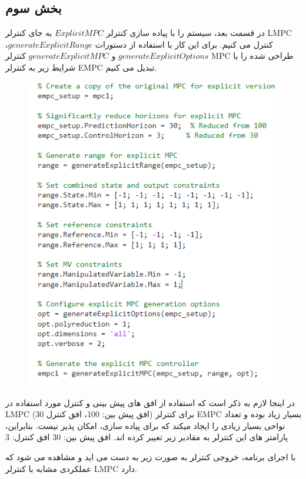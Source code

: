 \subsection*{بخش سوم}
در قسمت بعد، سیستم را با پیاده سازی کنترلر $Explicit MPC$ به جای کنترلر LMPC کنترل می کنیم. 
برای این کار با استفاده از دستورات $generateExplicitRange$،
$generateExplicitOptions$ و 
$generateExplicitMPC$
کنترلر MPC طراحی شده را با شرایط زیر به کنترلر EMPC تبدیل می کنیم. 
\begin{figure}[H]
	\centering
	\includegraphics[width=1\linewidth]{../img/26}
	\caption{}
	\label{fig:26}
\end{figure}

در اینجا لازم به ذکر است که استفاده از افق های پیش بینی و کنترل مورد استفاده در LMPC (افق پیش بین: 100، افق کنترل 30) برای کنترلر EMPC بسیار زیاد بوده و تعداد نواحی بسیار زیادی را ایجاد میکند که برای پیاده سازی، امکان پذیر نیست. بنابراین، پارامتر های این کنترلر به مقادیر زیر تغییر کرده اند.
افق پیش بین: 30
افق کنترل: 3

با اجرای برنامه، خروجی کنترلر به صورت زیر به دست می اید و مشاهده می شود که عملکردی مشابه با کنترلر LMPC دارد. 

